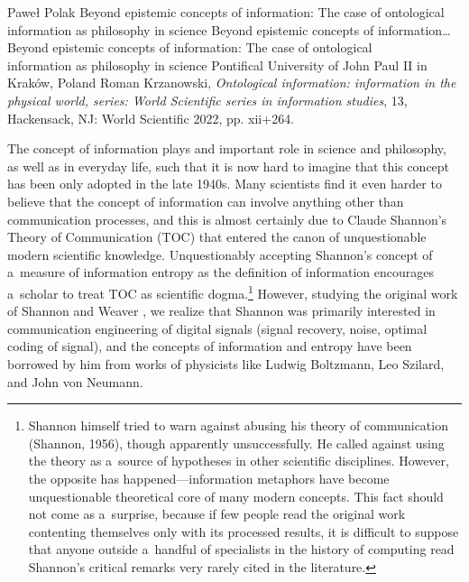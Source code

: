 \begin{newrevengenv}{Paweł Polak}
	{Beyond epistemic concepts of information: The case of ontological information as philosophy in science}
	{Beyond epistemic concepts of information\ldots}
	{Beyond epistemic concepts of information: The case of ontological\\information as philosophy in science}
	{Pontifical University of John Paul II in Kraków, Poland}
	{Roman Krzanowski, \textit{Ontological information: information in the physical world, series: World Scientific series in information studies}, 13, Hackensack, NJ: World Scientific 2022, pp. xii+264.}
	
	
	
%
%
%

\lettrine[loversize=0.13,lines=2,lraise=-0.03,nindent=0em,findent=0.2pt]%
{T}{}he concept of information plays and important role in science and philosophy, as well as in everyday life, such that it is now hard to imagine that this concept has been only adopted in the late 1940s. Many scientists find it even harder to believe that the concept of information can involve anything other than communication processes, and this is almost certainly due to Claude Shannon's Theory of Communication (TOC)
\parencite*[][]{shannon_mathematical_1949} %
 that entered the canon of unquestionable modern scientific knowledge. Unquestionably accepting Shannon's concept of a~measure of information entropy as the definition of information encourages a~scholar to treat TOC as scientific dogma.\footnote{ Shannon himself tried to warn against abusing his theory of communication (Shannon, 1956), though apparently unsuccessfully. He called against using the theory as a~source of hypotheses in other scientific disciplines. However, the opposite has happened—information metaphors have become unquestionable theoretical core of many modern concepts. This fact should not come as a~surprise, because if few people read the original work contenting themselves only with its processed results, it is difficult to suppose that anyone outside a~handful of specialists in the history of computing read Shannon's critical remarks very rarely cited in the literature.} However, studying the original work of Shannon and Weaver 
\parencite*[][p.3]{shannon_mathematical_1964}, %
 we realize that Shannon was primarily interested in communication engineering of digital signals (signal recovery, noise, optimal coding of signal), and the concepts of information and entropy have been borrowed by him from works of physicists like Ludwig Boltzmann, Leo Szilard, and John von Neumann.


\end{newrevengenv}
